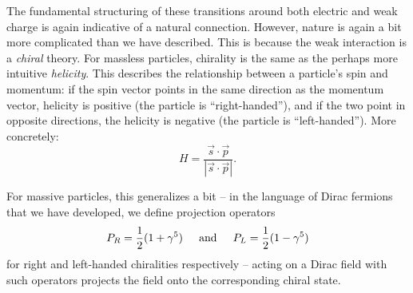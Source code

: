 The fundamental structuring of these transitions around both electric and weak charge is again indicative of a natural 
connection. However, nature is again a bit more complicated than we have described. This is because the weak interaction
is a \emph{chiral} theory. For massless particles, chirality is the same as the perhaps more intuitive \emph{helicity}. 
This describes the relationship between a particle's spin and momentum: if the spin vector points in the same 
direction as the momentum vector, helicity is positive (the particle is ``right-handed''), and if the two point 
in opposite directions, the helicity is negative (the particle is ``left-handed''). More concretely:
\begin{equation}
H = \frac{\vec{s}\cdot\vec{p}}{|\vec{s}\cdot \vec{p}|}.
\end{equation}

For massive particles, this generalizes a bit -- in the language of Dirac fermions that we have developed, 
we define projection operators
\begin{equation}
P_{R} = \frac{1}{2}(1+\gamma^{5}) \hspace{0.2in}\text{and}\hspace{0.2in}P_{L} = \frac{1}{2}(1-\gamma^{5}) 
\end{equation}
for right and left-handed chiralities respectively -- acting on a Dirac field with such operators 
projects the field onto the corresponding chiral state.

